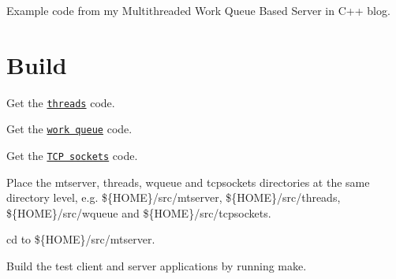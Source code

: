 Example code from my Multithreaded Work Queue Based Server in C++ blog.

\section*{Build}


\begin{DoxyEnumerate}
\item Get the \href{https://github.com/vichargrave/threads.git}{\tt threads} code.
\item Get the \href{https://github.com/vichargrave/wqueue}{\tt work queue} code.
\item Get the \href{https://github.com/vichargrave/tcpsockets}{\tt T\+C\+P sockets} code.
\item Place the mtserver, threads, wqueue and tcpsockets directories at the same directory level, e.\+g. {\ttfamily \$\{H\+O\+M\+E\}/src/mtserver}, {\ttfamily \$\{H\+O\+M\+E\}/src/threads}, {\ttfamily \$\{H\+O\+M\+E\}/src/wqueue} and {\ttfamily \$\{H\+O\+M\+E\}/src/tcpsockets}.
\item cd to {\ttfamily \$\{H\+O\+M\+E\}/src/mtserver}.
\item Build the test client and server applications by running {\ttfamily make}. 
\end{DoxyEnumerate}